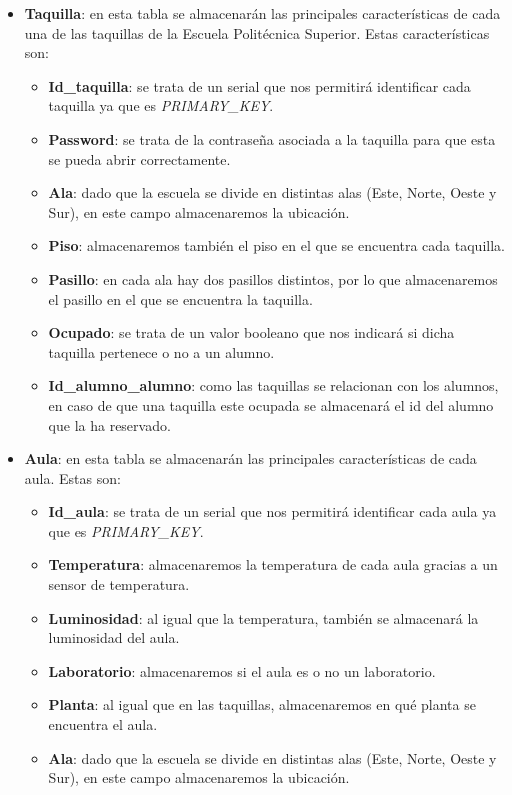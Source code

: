 \documentclass[12pt]{report}
\begin{document}
\begin{itemize}
    \item\textbf{Taquilla}: en esta tabla se almacenarán las principales características de cada una de las taquillas de la Escuela Politécnica Superior. Estas características son:
    \begin{itemize}
        \item\textbf{Id\_taquilla}: se trata de un serial que nos permitirá identificar cada taquilla ya que es \textit{PRIMARY\_KEY}.
        \item \textbf{Password}: se trata de la contraseña asociada a la taquilla para que esta se pueda abrir correctamente.
        \item \textbf{Ala}: dado que la escuela se divide en distintas alas (Este, Norte, Oeste y Sur), en este campo almacenaremos la ubicación.
        \item \textbf{Piso}: almacenaremos también el piso en el que se encuentra cada taquilla.
        \item \textbf{Pasillo}: en cada ala hay dos pasillos distintos, por lo que almacenaremos el pasillo en el que se encuentra la taquilla.
        \item \textbf{Ocupado}: se trata de un valor booleano que nos indicará si dicha taquilla pertenece o no a un alumno.
        \item \textbf{Id\_alumno\_alumno}: como las taquillas se relacionan con los alumnos, en caso de que una taquilla este ocupada se almacenará el id del alumno que la ha reservado.
        \\
    \end{itemize}
    \item \textbf{Aula}: en esta tabla se almacenarán las principales características de cada aula. Estas son:
    \begin{itemize}
        \item\textbf{Id\_aula}: se trata de un serial que nos permitirá identificar cada aula ya que es \textit{PRIMARY\_KEY}.
        \item \textbf{Temperatura}: almacenaremos la temperatura de cada aula gracias a un sensor de temperatura.
        \item \textbf{Luminosidad}: al igual que la temperatura, también se almacenará la luminosidad del aula.
        \item \textbf{Laboratorio}: almacenaremos si el aula es o no un laboratorio.
        \item \textbf{Planta}: al igual que en las taquillas, almacenaremos en qué planta se encuentra el aula.
        \item \textbf{Ala}: dado que la escuela se divide en distintas alas (Este, Norte, Oeste y Sur), en este campo almacenaremos la ubicación.

\end{itemize}
\end{itemize}
\end{document}
